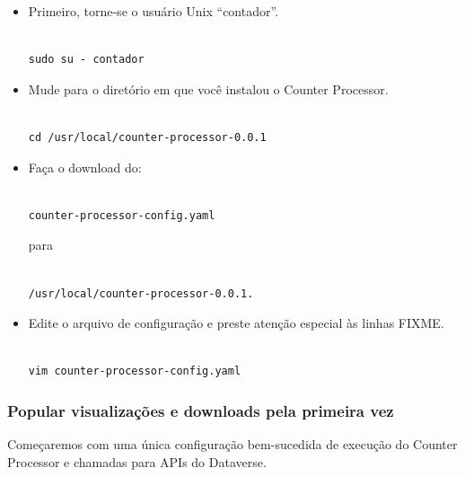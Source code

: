 \documentclass[12pt,hidelinks]{article}
\begin{document}
\begin{itemize}
    
\item Primeiro, torne-se o usuário Unix “contador”.

\begin{verbatim}

sudo su - contador

\end{verbatim}

\item Mude para o diretório em que você instalou o Counter Processor.

\begin{verbatim}

cd /usr/local/counter-processor-0.0.1

\end{verbatim}

\item Faça o download do:

\begin{verbatim}

counter-processor-config.yaml 

\end{verbatim}

\newpage
para 

\begin{verbatim}

/usr/local/counter-processor-0.0.1.

\end{verbatim}

\item Edite o arquivo de configuração e preste atenção especial às linhas FIXME.

\begin{verbatim}

vim counter-processor-config.yaml

\end{verbatim}

\end{itemize}

\subsubsection{Popular visualizações e downloads pela primeira vez}

\qquad Começaremos com uma única configuração bem-sucedida de execução do Counter Processor e chamadas para APIs do Dataverse.
\end{document}
